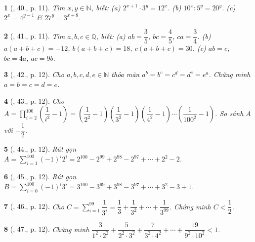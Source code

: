 \documentclass{article}
\newtheorem{baitoan}{}
\begin{document}
\begin{baitoan}[\cite{Binh_Toan_7_tap_1}, 40., p. 11]
	Tìm $x,y\in\mathbb{N}$, biết: (a) $2^{x+1}\cdot 3^y = 12^x$. (b) $10^x:5^y = 20^y$.	(c) $2^x = 4^{y-1}$ \& $27^y = 3^{x+8}$.
\end{baitoan}

\begin{baitoan}[\cite{Binh_Toan_7_tap_1}, 41., p. 11]
	Tìm $a,b,c\in\mathbb{Q}$, biết: (a) $ab = \dfrac{3}{5}$, $bc = \dfrac{4}{5}$, $ca = \dfrac{3}{4}$.	(b) $a(a + b + c) = -12$, $b(a + b + c) = 18$, $c(a + b + c) = 30$. (c) $ab = c$, $bc = 4a$, $ac = 9b$.
\end{baitoan}

\begin{baitoan}[\cite{Binh_Toan_7_tap_1}, 42., p. 12]
	Cho $a,b,c,d,e\in\mathbb{N}$ thỏa mãn $a^b = b^c = c^d = d^e = e^a$. Chứng minh $a = b = c = d = e$.
\end{baitoan}

\begin{baitoan}[\cite{Binh_Toan_7_tap_1}, 43., p. 12]
	Cho $A = \prod_{i=2}^{100} \left(\dfrac{1}{i^2} - 1\right) = \left(\dfrac{1}{2^2} - 1\right)\left(\dfrac{1}{3^2} - 1\right)\left(\dfrac{1}{4^2} - 1\right)\cdots\left(\dfrac{1}{100^2} - 1\right)$. So sánh $A$ với $-\dfrac{1}{2}$.
\end{baitoan}

\begin{baitoan}[\cite{Binh_Toan_7_tap_1}, 44., p. 12]
	Rút gọn $A = \sum_{i=1}^{100} (-1)^i2^i = 2^{100} - 2^{99} + 2^{98} - 2^{97} + \cdots + 2^2 - 2$.
\end{baitoan}

\begin{baitoan}[\cite{Binh_Toan_7_tap_1}, 45., p. 12]
	Rút gọn $B = \sum_{i=0}^{100} (-1)^i3^i = 3^{100} - 3^{99} + 3^{98} - 3^{97} + \cdots + 3^2 - 3 + 1$.
\end{baitoan}

\begin{baitoan}[\cite{Binh_Toan_7_tap_1}, 46., p. 12]
	Cho $C = \sum_{i=1}^{99} \dfrac{1}{3^i} = \dfrac{1}{3} + \dfrac{1}{3^2} + \cdots + \dfrac{1}{3^{99}}$. Chứng minh $C < \dfrac{1}{2}$.
\end{baitoan}

\begin{baitoan}[\cite{Binh_Toan_7_tap_1}, 47., p. 12]
	Chứng minh $\dfrac{3}{1^2\cdot 2^2} + \dfrac{5}{2^2\cdot 3^2} + \dfrac{7}{3^2\cdot 4^2} + \cdots + \dfrac{19}{9^2\cdot 10^2} < 1$.
\end{baitoan}
\end{document}
